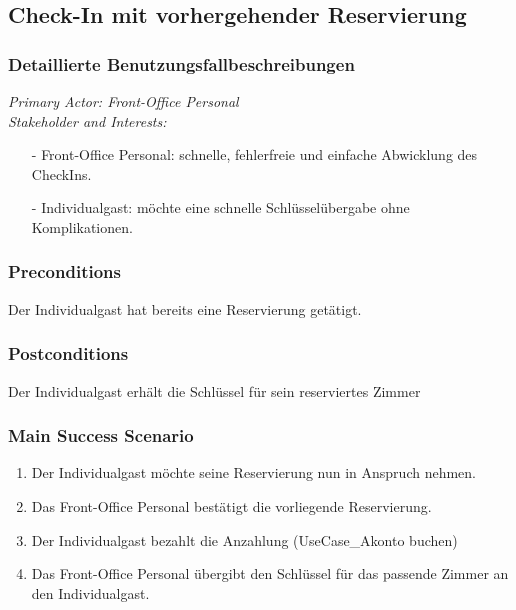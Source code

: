 \documentclass[./detailed_overview_usecases.tex]{subfiles}
\begin{document}
    \subsection{Check-In mit vorhergehender Reservierung}
    \subsubsection{Detaillierte Benutzungsfallbeschreibungen}
    \textit{Primary Actor: Front-Office Personal}
    \\
    \textit{Stakeholder and Interests:}
    \begin{itemize}
        \item[-] Front-Office Personal: schnelle, fehlerfreie und einfache Abwicklung des CheckIns.
        \item[-] Individualgast: möchte eine schnelle Schlüsselübergabe ohne Komplikationen.
    \end{itemize}

    \subsubsection*{Preconditions}
    Der Individualgast hat bereits eine Reservierung getätigt.
    \subsubsection*{Postconditions}
    Der Individualgast erhält die Schlüssel für sein reserviertes Zimmer

    \subsubsection*{Main Success Scenario}
    \begin{enumerate}
        \item Der Individualgast möchte seine Reservierung nun in Anspruch nehmen.
        \item Das Front-Office Personal bestätigt die vorliegende Reservierung.
        \item Der Individualgast bezahlt die Anzahlung (UseCase_Akonto buchen)
        \item Das Front-Office Personal übergibt den Schlüssel für das passende Zimmer an den Individualgast.
    \end{enumerate}
\end{document}
